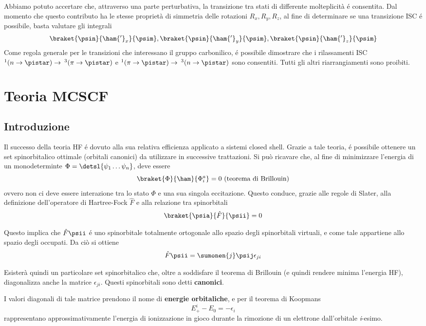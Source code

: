 Abbiamo potuto accertare che, attraverso una parte perturbativa, la
transizione tra stati di differente molteplicit\`a \'e consentita.
Dal momento che questo contributo ha le stesse propriet\`a di simmetria
delle rotazioni $R_x, R_y, R_z$, al fine di determinare se una
transizione ISC \'e possibile, basta valutare gli integrali
$$
\braket{\psin}{\ham{'}_{x}}{\psim}, \braket{\psin}{\ham{'}_{y}}{\psim}, \braket{\psin}{\ham{'}_{z}}{\psim}
$$
Come regola generale per le transizioni che interessano il gruppo
carbonilico, \'e possibile dimostrare che i rilassamenti ISC $ ^1(n \rightarrow
\pistar) \rightarrow \: ^3 (\pi \rightarrow \pistar) $ e $ ^1(\pi
\rightarrow \pistar) \rightarrow \:^3(n \rightarrow \pistar) $ sono
consentiti. Tutti gli altri riarrangiamenti sono proibiti.

\section{Teoria MCSCF}

\subsection{Introduzione}

Il successo della teoria HF \'e dovuto alla sua relativa efficienza
applicato a sistemi closed shell. Grazie a tale teoria, \'e possibile
ottenere un set spinorbitalico ottimale (orbitali canonici) da
utilizzare in successive trattazioni.
Si pu\`o ricavare che, al fine di minimizzare l'energia di un 
monodeterminte $\Phi = \detsl{\psi_1 \ldots \psi_n} $, deve essere
$$
\braket{\Phi}{\ham}{\Phi_i^a} = 0 \mbox{ (teorema di Brillouin)}
$$
ovvero non ci deve essere interazione tra lo stato $\Phi$ e una sua
singola eccitazione. Questo conduce, grazie alle regole di Slater,
alla definizione dell'operatore di Hartree-Fock $\hat{F}$ e alla 
relazione tra spinorbitali
$$
\braket{\psia}{\hat{F}}{\psii} = 0
$$

Questo implica che $\hat{F}\psii$ \'e uno spinorbitale totalmente
ortogonale allo spazio degli spinorbitali virtuali, e come tale
appartiene allo spazio degli occupati. Da ci\`o si ottiene
$$
\hat{F}\psii = \sumonen{j}\psij\epsilon_{ji}
$$

Esister\`a quindi un particolare set spinorbitalico che, oltre a
soddisfare il teorema di Brillouin (e quindi rendere minima l'energia
HF), diagonalizza anche la matrice $\epsilon_{ji}$. Questi spinorbitali
sono detti \textbf{canonici}. 

I valori diagonali di tale matrice prendono il nome di \textbf{energie
orbitaliche}, e per il teorema di Koopmans
$$
E_+^i-E_0 = -\epsilon_i
$$
rappresentano approssimativamente l'energia di ionizzazione in gioco
durante la rimozione di un elettrone dall'orbitale \textit{i}-esimo.

